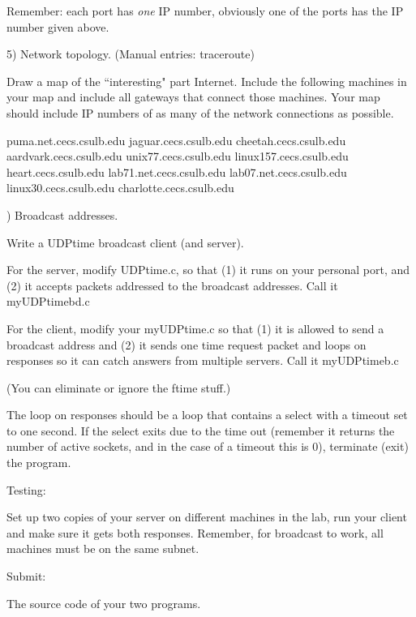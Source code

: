 Remember: each port has {\it one} IP number, obviously
one of the ports has the IP number given above.

5) Network topology. 
(Manual entries: traceroute)

Draw a map of the ``interesting" part Internet.
Include the following machines in your map and include all gateways
that connect those machines.
Your map should include IP numbers of as many of the network connections
as possible.

\medskip

{\obeylines\parskip=0pt

puma.net.cecs.csulb.edu
jaguar.cecs.csulb.edu
cheetah.cecs.csulb.edu
aardvark.cecs.csulb.edu
unix77.cecs.csulb.edu
linux157.cecs.csulb.edu
heart.cecs.csulb.edu
lab71.net.cecs.csulb.edu
lab07.net.cecs.csulb.edu
linux30.cecs.csulb.edu
charlotte.cecs.csulb.edu

}

\vfill{}) Broadcast addresses.

Write a UDPtime broadcast client (and server).

For the server, 
modify {\ltt{}UDPtime.c}, so that (1) it runs
on your personal port, and (2) it accepts packets
addressed to the broadcast addresses.
Call it {\ltt{}myUDPtimebd.c}

For the client,
modify your {\ltt{}myUDPtime.c} so that 
(1) it is allowed to send a broadcast address
and
(2) it sends one time request packet and
loops on responses so it can catch answers from
multiple servers.
Call it {\ltt{}myUDPtimeb.c}

(You can eliminate or ignore the ftime stuff.)

The loop on responses should be a loop
that contains a select with a timeout set
to one second.
If the select exits due to the time out (remember
it returns the number of active sockets, and in
the case of a timeout this is 0),
terminate (exit) the program.

Testing:

Set up two copies of your server on different machines
in the lab, run your client and make sure it
gets both responses.
Remember, for broadcast to work, all machines must
be on the same subnet.

Submit:

The source code of your two programs.
\bye
